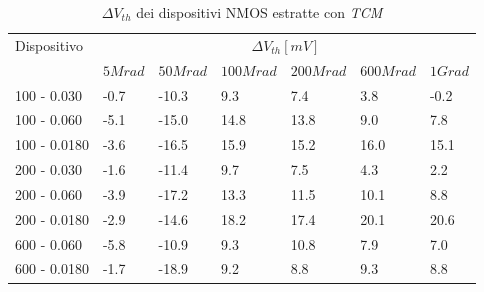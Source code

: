 \begin{table}[H]
  \renewcommand{\arraystretch}{1.3}
  \begin{tabular}{m{2.1cm}  m{1.1cm} m{1.3cm} m{1.5cm} m{1.5cm} m{1.5cm} m{1cm}}
    \toprule
    \multirow{2}{*}{Dispositivo} & \multicolumn{6}{c}{$\Delta V_{th} [mV] $}                                                          \\
    \cmidrule{2-7}
                                 & $5Mrad$                                   & $50Mrad$ & $100Mrad$ & $200Mrad$ & $600Mrad$ & $1Grad$ \\
    \midrule
    100 - 0.030                     & -0.7                                      & -10.3    & 9.3       & 7.4       & 3.8       & -0.2        \\
    \hline
    100 - 0.060                     & -5.1                                      & -15.0    & 14.8      & 13.8      & 9.0       & 7.8        \\
    \hline
    100 - 0.0180                    & -3.6                                      & -16.5    & 15.9      & 15.2      & 16.0      & 15.1        \\
    \hline
    200 - 0.030                     & -1.6                                      & -11.4    & 9.7       & 7.5       & 4.3       & 2.2        \\
    \hline
    200 - 0.060                     & -3.9                                      & -17.2    & 13.3      & 11.5      & 10.1      & 8.8        \\
    \hline
    200 - 0.0180                     & -2.9                                      & -14.6    & 18.2      & 17.4      & 20.1      & 20.6        \\
    \hline
    600 - 0.060                     & -5.8                                      & -10.9    & 9.3       & 10.8      & 7.9       & 7.0        \\
    \hline
    600 - 0.0180                    & -1.7                                      & -18.9    & 9.2       & 8.8       & 9.3       & 8.8        \\
    \bottomrule
  \end{tabular}
  \caption{$\Delta V_{th}$ dei dispositivi NMOS estratte con \emph{TCM}}
  \label{tab:deltaVthTCMN}
\end{table}

